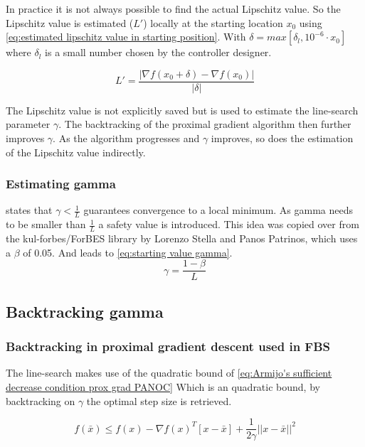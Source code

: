 			In practice it is not always possible to find the actual Lipschitz value. So the Lipschitz value is estimated ($L'$) locally at the starting location $x_0$ using \eqref{eq:estimated lipschitz value in starting position}. With $\delta=max[\delta_l,10^{-6} \cdot x_0]$ where $\delta_l$ is a small number chosen by the controller designer.
			
			\begin{equation}
			L' = \frac{|\nabla f(x_0+\delta)-\nabla f(x_0)|}{|\delta|}
			\label{eq:estimated lipschitz value in starting position}
			\end{equation}
			
			The Lipschitz value is not explicitly saved but is used to estimate the line-search parameter $\gamma$. The backtracking of the proximal gradient algorithm then further improves $\gamma$. As the algorithm progresses and $\gamma$ improves, so does the estimation of the Lipschitz value indirectly.
		
		\subsubsection{Estimating gamma}	
			\cite{LorenzoStella2017} states that $\gamma<\frac{1}{L}$ guarantees convergence to a local minimum. As gamma needs to be smaller than $\frac{1}{L}$ a safety value is introduced. This idea was copied over from the kul-forbes/ForBES library by Lorenzo Stella and Panos Patrinos, which uses a $\beta$ of 0.05. And leads to \eqref{eq:starting value gamma}.
			\begin{equation}
			\gamma = \frac{1-\beta}{L}
			\label{eq:starting value gamma}
			\end{equation}		
	
	\subsection{Backtracking gamma}			
		\subsubsection{Backtracking in proximal gradient descent used in FBS}
			The line-search makes use of the quadratic bound of \eqref{eq:Armijo's sufficient decrease condition prox grad PANOC} Which is an quadratic bound, by backtracking on $\gamma$ the optimal step size is retrieved.
			
			\begin{equation}
			f({\bar{x}}) \leq f(x) - \nabla f(x)^T[x-\bar{x}] + \frac{1}{2 \gamma}||x-\bar{x}||^2
			\label{eq:Armijo's sufficient decrease condition prox grad PANOC}
			\end{equation}
			
